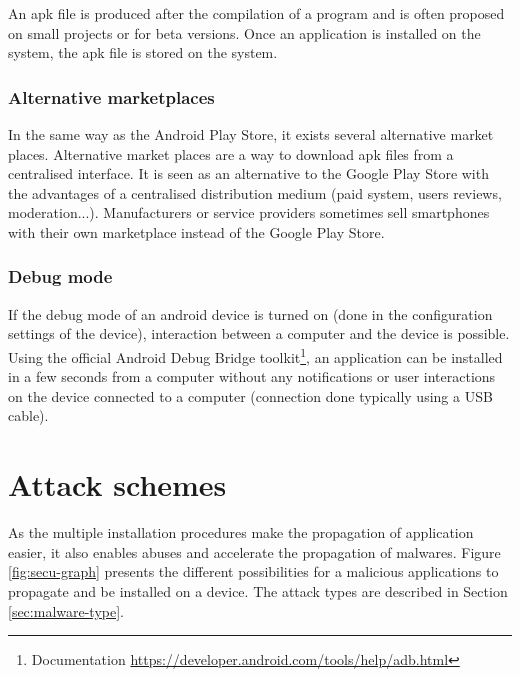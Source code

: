 An apk file is produced after the compilation of a program and is often proposed on small projects or for beta versions.
Once an application is installed on the system, the apk file is stored on the system.

\subsubsection{Alternative marketplaces}
In the same way as the Android Play Store, it exists several alternative market places.
Alternative market places are a way to download apk files from a centralised interface.
It is seen as an alternative to the Google Play Store with the advantages of a centralised distribution medium (paid system, users reviews, moderation...).
Manufacturers or service providers sometimes sell smartphones with their own marketplace instead of the Google Play Store.\\


\subsubsection{Debug mode}
If the debug mode of an android device is turned on (done in the configuration settings of the device), interaction between a computer and the device is possible.
Using the official Android Debug Bridge toolkit\footnote{Documentation \url{https://developer.android.com/tools/help/adb.html}}, an application can be installed in a few seconds from a computer without any notifications or user interactions on the device connected to a computer (connection done typically using a USB cable).

\section{Attack schemes}
\label{sec:and-attack-scheme}

As the multiple installation procedures make the propagation of application easier, it also enables abuses and accelerate the propagation of malwares.
Figure \ref{fig:secu-graph} presents the different possibilities for a malicious applications to propagate and be installed on a device.
The attack types are described in Section \ref{sec:malware-type}.

